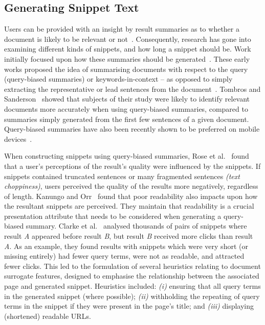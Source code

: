 
\subsection{Generating Snippet Text}
Users can be provided with an insight by result summaries as to whether a document is likely to be relevant or not~\cite{he2012bridging}. Consequently, research has gone into examining different kinds of snippets, and how long a snippet should be. Work initially focused upon how these summaries should be generated~\cite{landauer1993enhancing,leal2015query,pedersen1991snippet,tombros1998query_biased,white2003task}. These early works proposed the idea of summarising documents with respect to the query (query-biased summaries) or keywords-in-context -- as opposed to simply extracting the representative or lead sentences from the document~\cite{kupiec1995tds}. Tombros and Sanderson~\cite{tombros1998query_biased} showed that subjects of their study were likely to identify relevant documents more accurately when using query-biased summaries, compared to summaries simply generated from the first few sentences of a given document. Query-biased summaries have also been recently shown to be preferred on mobile devices~\cite{spirin2016snippets}.

When constructing snippets using query-biased summaries, Rose et al.~\cite{rose2007snippet_attributes} found that a user's perceptions of the result's quality were influenced by the snippets. If snippets contained truncated sentences or many fragmented sentences \emph{(text choppiness)}, users perceived the quality of the results more negatively, regardless of length. Kanungo and Orr~\cite{kanungo2009snippet_readability} found that poor readability also impacts upon how the resultant snippets are perceived. They maintain that readability is a crucial presentation attribute that needs to be considered when generating a query-biased summary. Clarke et al.~\cite{clarke2007caption_features} analysed thousands of pairs of snippets where result \emph{A} appeared before result \emph{B}, but result \emph{B} received more clicks than result \emph{A}. As an example, they found results with snippets which were very short (or missing entirely) had fewer query terms, were not as readable, and attracted fewer clicks. This led to the formulation of several heuristics relating to document surrogate features, designed to emphasise the relationship between the associated page and generated snippet. Heuristics included: \emph{(i)} ensuring that all query terms in the generated snippet (where possible); \emph{(ii)} withholding the repeating of query terms in the snippet if they were present in the page's title; and \emph{(iii)} displaying (shortened) readable URLs.

